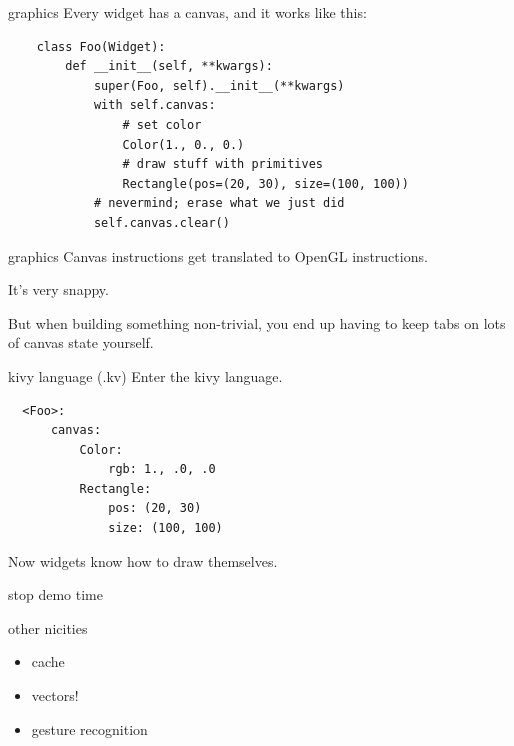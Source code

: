 \documentclass{beamer}
\begin{document}


\begin{frame}[fragile]{graphics}
  Every widget has a canvas, and it works like this:
  \begin{verbatim}
    class Foo(Widget):
        def __init__(self, **kwargs):
            super(Foo, self).__init__(**kwargs)
            with self.canvas:
                # set color
                Color(1., 0., 0.)
                # draw stuff with primitives
                Rectangle(pos=(20, 30), size=(100, 100))
            # nevermind; erase what we just did
            self.canvas.clear()
  \end{verbatim}
\end{frame}


\begin{frame}{graphics}
  Canvas instructions get translated to OpenGL instructions.

  It's very snappy.

  \pause
  But when building something non-trivial, you end up having to keep
  tabs on lots of canvas state yourself.
\end{frame}


\begin{frame}[fragile]{kivy language (.kv)}
  Enter the kivy language.
  \begin{lstlisting}
  <Foo>:
      canvas:
          Color:
              rgb: 1., .0, .0
          Rectangle:
              pos: (20, 30)
              size: (100, 100)
  \end{lstlisting}

  Now widgets know how to draw themselves.
\end{frame}


\begin{frame}{stop}
  demo time
\end{frame}


\begin{frame}{other nicities}
  \begin{itemize}
  \item cache
  \pause
  \item vectors!
  \pause
  \item gesture recognition
  \end{itemize}
\end{frame}
\end{document}
